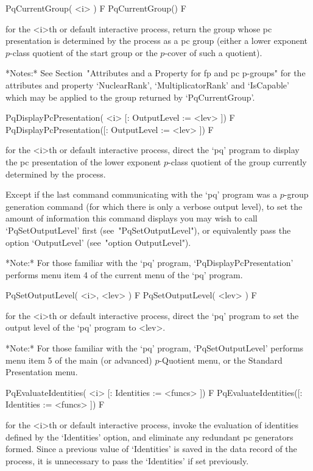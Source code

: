 \>PqCurrentGroup( <i> ) F
\>PqCurrentGroup() F

for the <i>th or default interactive {\ANUPQ} process, return  the  group
whose pc presentation is determined by the process as a {\GAP}  pc  group
(either a lower exponent $p$-class quotient of the  start  group  or  the
$p$-cover of such a quotient).

*Notes:*
See Section~"Attributes and a Property for fp and pc  p-groups"  for  the
attributes   and   property   `NuclearRank',   `MultiplicatorRank'    and
`IsCapable'  which  may   be   applied   to   the   group   returned   by
`PqCurrentGroup'.

\>PqDisplayPcPresentation( <i> [: OutputLevel := <lev> ]) F
\>PqDisplayPcPresentation([: OutputLevel := <lev> ]) F

for the <i>th or default interactive {\ANUPQ} process,  direct  the  `pq'
program to display the pc presentation of  the  lower  exponent  $p$-class
quotient of the group currently determined by the process.

Except if the last command communicating  with  the  `pq'  program  was  a
$p$-group generation command (for which there is only  a  verbose  output
level), to set the amount of information this command  displays  you  may
wish  to  call  `PqSetOutputLevel'  first  (see~"PqSetOutputLevel"),   or
equivalently pass the option `OutputLevel' (see~"option OutputLevel").

*Note:*
For  those  familiar  with  the  `pq'  program,  `PqDisplayPcPresentation'
performs menu item 4 of the current menu of the `pq' program.

\>PqSetOutputLevel( <i>, <lev> ) F
\>PqSetOutputLevel( <lev> ) F

for the <i>th or default interactive {\ANUPQ} process,  direct  the  `pq'
program to set the output level of the `pq' program to <lev>.

*Note:* For those  familiar  with  the  `pq'  program,  `PqSetOutputLevel'
performs menu item 5 of the main (or advanced) $p$-Quotient menu, or  the
Standard Presentation menu.

\>PqEvaluateIdentities( <i> [: Identities := <funcs> ]) F
\>PqEvaluateIdentities([: Identities := <funcs> ]) F

for the  <i>th  or  default  interactive  {\ANUPQ}  process,  invoke  the
evaluation  of  identities  defined  by  the  `Identities'  option,   and
eliminate any redundant pc generators formed. Since a previous  value  of
`Identities'  is  saved  in  the  data  record  of  the  process,  it  is
unnecessary to pass the `Identities' if set previously.

